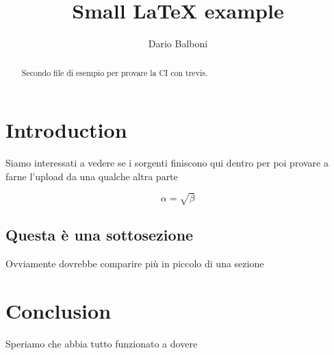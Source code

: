 \documentclass{article}
\begin{document}
	\title{Small \LaTeX{} example}
	\author{Dario Balboni}
	\maketitle

	\begin{abstract}
		Secondo file di esempio per provare la CI con trevis.
	\end{abstract}

	\section{Introduction}
		Siamo interessati a vedere se i sorgenti finiscono qui dentro
		per poi provare a farne l'upload da una qualche altra parte

	\begin{equation}
	    \label{dummy_equation}
	    \alpha = \sqrt{ \beta }
	\end{equation}

	\subsection{Questa è una sottosezione}
		Ovviamente dovrebbe comparire più in piccolo di una sezione

	\section{Conclusion}
		Speriamo che abbia tutto funzionato a dovere
\end{document}
